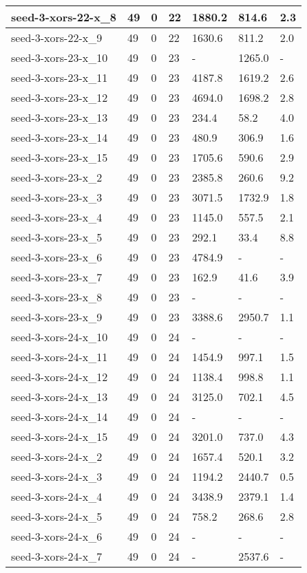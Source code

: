 \begin{scriptsize}
\begin{longtable}{|p{5cm}|l|l|l|l|l|l|}
seed-3-xors-22-x\_8&49&0&22&1880.2&814.6&2.3 \\ \hline 
seed-3-xors-22-x\_9&49&0&22&1630.6&811.2&2.0 \\ \hline 
seed-3-xors-23-x\_10&49&0&23&-&1265.0&- \\ \hline 
seed-3-xors-23-x\_11&49&0&23&4187.8&1619.2&2.6 \\ \hline 
seed-3-xors-23-x\_12&49&0&23&4694.0&1698.2&2.8 \\ \hline 
seed-3-xors-23-x\_13&49&0&23&234.4&58.2&4.0 \\ \hline 
seed-3-xors-23-x\_14&49&0&23&480.9&306.9&1.6 \\ \hline 
seed-3-xors-23-x\_15&49&0&23&1705.6&590.6&2.9 \\ \hline 
seed-3-xors-23-x\_2&49&0&23&2385.8&260.6&9.2 \\ \hline 
seed-3-xors-23-x\_3&49&0&23&3071.5&1732.9&1.8 \\ \hline 
seed-3-xors-23-x\_4&49&0&23&1145.0&557.5&2.1 \\ \hline 
seed-3-xors-23-x\_5&49&0&23&292.1&33.4&8.8 \\ \hline 
seed-3-xors-23-x\_6&49&0&23&4784.9&-&- \\ \hline 
seed-3-xors-23-x\_7&49&0&23&162.9&41.6&3.9 \\ \hline 
seed-3-xors-23-x\_8&49&0&23&-&-&- \\ \hline 
seed-3-xors-23-x\_9&49&0&23&3388.6&2950.7&1.1 \\ \hline 
seed-3-xors-24-x\_10&49&0&24&-&-&- \\ \hline 
seed-3-xors-24-x\_11&49&0&24&1454.9&997.1&1.5 \\ \hline 
seed-3-xors-24-x\_12&49&0&24&1138.4&998.8&1.1 \\ \hline 
seed-3-xors-24-x\_13&49&0&24&3125.0&702.1&4.5 \\ \hline 
seed-3-xors-24-x\_14&49&0&24&-&-&- \\ \hline 
seed-3-xors-24-x\_15&49&0&24&3201.0&737.0&4.3 \\ \hline 
seed-3-xors-24-x\_2&49&0&24&1657.4&520.1&3.2 \\ \hline 
seed-3-xors-24-x\_3&49&0&24&1194.2&2440.7&0.5 \\ \hline 
seed-3-xors-24-x\_4&49&0&24&3438.9&2379.1&1.4 \\ \hline 
seed-3-xors-24-x\_5&49&0&24&758.2&268.6&2.8 \\ \hline 
seed-3-xors-24-x\_6&49&0&24&-&-&- \\ \hline 
seed-3-xors-24-x\_7&49&0&24&-&2537.6&- \\ \hline 

\end{longtable}
\end{scriptsize}
